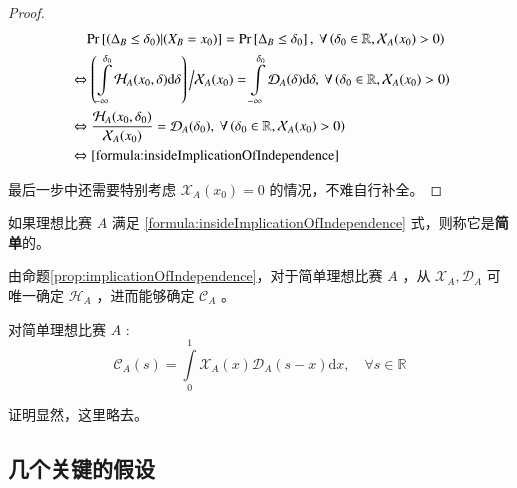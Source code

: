             \begin{proof}
                \begin{align*}
                    &\phantom{\Leftrightarrow\ }\mathrm{Pr}\left[(\Delta_B\leq\delta_0)|(X_B=x_0)\right]=\mathrm{Pr}\left[\Delta_B\leq\delta_0\right],\ \forall \left(\delta_0\in\mathbb{R},\mathcal{X}_A(x_0)>0\right) \\
                    &\Leftrightarrow \left(\displaystyle\int\limits_{-\infty}^{\delta_0} \mathcal{H}_A(x_0,\delta)\mathrm{d}\delta\right)\Big/{\mathcal{X}_A(x_0)}=\int\limits_{-\infty}^{\delta_0} \mathcal{D}_A(\delta)\mathrm{d}\delta,\ \forall \left(\delta_0\in\mathbb{R},\mathcal{X}_A(x_0)>0\right)\\
                    &\Leftrightarrow \frac{\mathcal{H}_A(x_0,\delta_0)}{\mathcal{X}_A(x_0)}=\mathcal{D}_A(\delta_0),\ \forall \left(\delta_0\in\mathbb{R},\mathcal{X}_A(x_0)>0\right)\\
                    &\Leftrightarrow \eqref{formula:insideImplicationOfIndependence}
                \end{align*}
                
                最后一步中还需要特别考虑 $\mathcal{X}_A(x_0)=0$ 的情况，不难自行补全。
            \end{proof}

            \begin{definition}[简单理想比赛]
                如果理想比赛 $A$ 满足 \eqref{formula:insideImplicationOfIndependence} 式，则称它是\textbf{简单}的。

                \label{def:simplicityOfContest}
            \end{definition}

            由命题\ref{prop:implicationOfIndependence}，对于简单理想比赛 $A$ ，从 $\mathcal{X}_A,\mathcal{D}_A$ 可唯一确定 $\mathcal{H}_A$ ，进而能够确定 $\mathcal{C}_A$ 。

            \begin{proposition}[简单理想比赛的分数分布函数]
                对简单理想比赛 $A$ :
                $$
                \mathcal{C}_A(s)=\int\limits_{0}^1 \mathcal{X}_A(x)\mathcal{D}_A(s-x) \mathrm{d}x,\quad\forall s\in\mathbb{R}
                $$

                \label{prop:scoreDistributionInSimpleContest}
            \end{proposition}

            证明显然，这里略去。

    \subsection{几个关键的假设}\label{sec:keyAssumptions}

